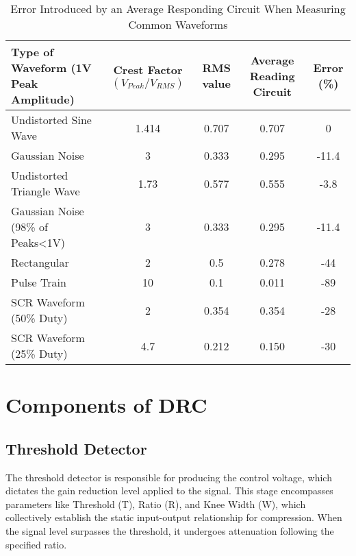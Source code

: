 \documentclass[10pt]{article}
\begin{document}
\begin{multicols}{2}
            \begin{table*}[!t]
                \centering
                \begin{tabularx}{\textwidth}{|l*{4}{|C}|}
                    \hline
                    Type of Waveform (1V Peak Amplitude) & Crest Factor $(V_{Peak}/V_{RMS})$ & RMS value & Average Reading Circuit & Error (\%) \\ \hline
                    Undistorted Sine Wave & 1.414 & 0.707 & 0.707 & 0 \\    \hline
                    Gaussian Noise & 3 & 0.333 & 0.295 & -11.4 \\   \hline
                    Undistorted Triangle Wave & 1.73 & 0.577 & 0.555 & -3.8 \\   \hline
                    Gaussian Noise (98\% of Peaks<1V) & 3 & 0.333 & 0.295 & -11.4 \\    \hline
                    Rectangular & 2 & 0.5 & 0.278 & -44 \\    \hline
                    Pulse Train & 10 & 0.1 & 0.011 & -89 \\    \hline
                    SCR Waveform (50\% Duty) & 2 & 0.354 & 0.354 & -28 \\    \hline
                    SCR Waveform (25\% Duty) & 4.7 & 0.212 & 0.150 & -30 \\    \hline
                \end{tabularx}
                \caption{Error Introduced by an Average Responding Circuit When Measuring Common Waveforms}
                \label{table:ave-err}
            \end{table*}

        \section{Components of DRC}

            \subsection{Threshold Detector}
                The threshold detector is responsible for producing the control voltage, which dictates the gain reduction level applied to the signal. This stage encompasses parameters like Threshold (T), Ratio (R), and Knee Width (W), which collectively establish the static input-output relationship for compression. When the signal level surpasses the threshold, it undergoes attenuation following the specified ratio.
            

\end{multicols}
\end{document}

